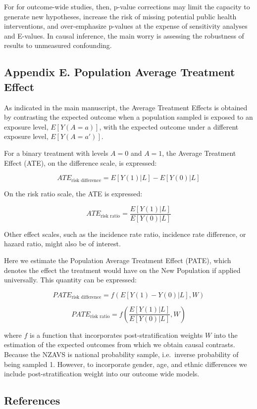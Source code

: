 \documentclass[
  singlecolumn,
  9pt]{scrartcl}
\begin{document}
For for outcome-wide studies, then, p-value corrections may limit the
capacity to generate new hypotheses, increase the risk of missing
potential public health interventions, and over-emphasize p-values at
the expense of sensitivity analyses and E-values. In causal inference,
the main worry is assessing the robustness of results to unmeasured
confounding.

\newpage{}

\subsection{Appendix E. Population Average Treatment
Effect}\label{appendix-e.-population-average-treatment-effect}

As indicated in the main manuscript, the Average Treatment Effects is
obtained by contrasting the expected outcome when a population sampled
is exposed to an exposure level, \(E[Y(A = a)]\), with the expected
outcome under a different exposure level, \(E[Y(A=a')]\).

For a binary treatment with levels \(A=0\) and \(A=1\), the Average
Treatment Effect (ATE), on the difference scale, is expressed:

\[ATE_{\text{risk difference}} = E[Y(1)|L] - E[Y(0)|L]\]

On the risk ratio scale, the ATE is expressed:

\[ATE_{\text{risk ratio}} = \frac{E[Y(1)|L]}{E[Y(0)|L]}\]

Other effect scales, such as the incidence rate ratio, incidence rate
difference, or hazard ratio, might also be of interest.

Here we estimate the Population Average Treatment Effect (PATE), which
denotes the effect the treatment would have on the New Population if
applied universally. This quantity can be expressed:

\[PATE_{\text{risk difference}} = f(E[Y(1) - Y(0)|L], W)\]

\[PATE_{\text{risk ratio}} = f\left(\frac{E[Y(1)|L]}{E[Y(0)|L]}, W\right)\]

where \(f\) is a function that incorporates post-stratification weights
\(W\) into the estimation of the expected outcomes from which we obtain
causal contrasts. Because the NZAVS is national probability sample,
i.e.~inverse probability of being sampled 1. However, to incorporate
gender, age, and ethnic differences we include post-stratification
weight into our outcome wide models.

\subsection*{References}\label{references}
\end{document}

